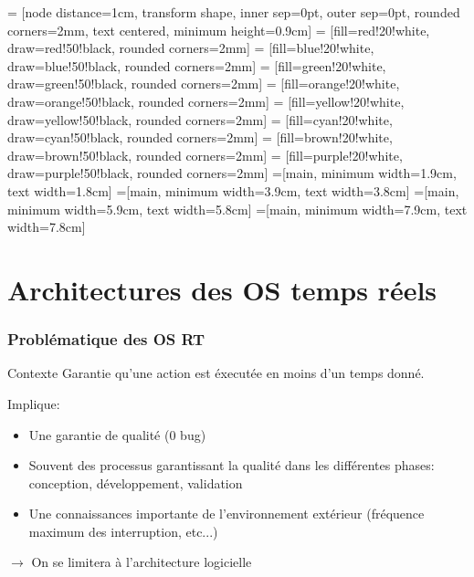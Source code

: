 %                                                                                                               
%
%


     = [node distance=1cm, transform shape, inner sep=0pt, outer sep=0pt, rounded corners=2mm, text centered, minimum height=0.9cm]
     = [fill=red!20!white,     draw=red!50!black,     rounded corners=2mm]
    = [fill=blue!20!white,    draw=blue!50!black,    rounded corners=2mm]
   = [fill=green!20!white,   draw=green!50!black,   rounded corners=2mm]
  = [fill=orange!20!white,  draw=orange!50!black,  rounded corners=2mm]
  = [fill=yellow!20!white,  draw=yellow!50!black,  rounded corners=2mm]
    = [fill=cyan!20!white,    draw=cyan!50!black,    rounded corners=2mm]
   = [fill=brown!20!white,   draw=brown!50!black,   rounded corners=2mm]
  = [fill=purple!20!white,  draw=purple!50!black,  rounded corners=2mm]
=[main, minimum width=1.9cm, text width=1.8cm]
=[main, minimum width=3.9cm, text width=3.8cm]
=[main, minimum width=5.9cm, text width=5.8cm]
=[main, minimum width=7.9cm, text width=7.8cm]

\part{Architectures des OS temps réels}

\section{Problématique des OS RT} %

\begin{frame}{Contexte}
  Garantie qu'une action est éxecutée en moins d'un temps donné.

  Implique:
  \begin{itemize}
    \item Une garantie de qualité (0 bug)
    \item Souvent des processus garantissant la qualité dans les différentes phases: conception, développement, validation
    \item Une connaissances importante de l'environnement extérieur (fréquence maximum des interruption, etc...)
  \end{itemize}
  $\to$ On se limitera à l'architecture logicielle
\end{frame}

